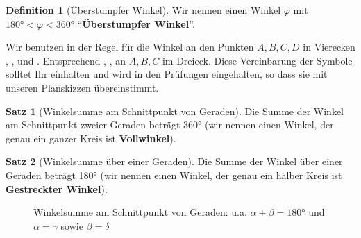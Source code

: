 \documentclass[a4paper]{book}%
\theoremstyle{definition}
\newtheorem{definition}{Definition}
\newtheorem{satz}{Satz}
\begin{document}
\begin{definition}[Überstumpfer Winkel]
    Wir nennen einen Winkel $\varphi$ mit $180° < \varphi < 360°$ \enquote{\textbf{Überstumpfer Winkel}}.
\end{definition}

Wir benutzen in der Regel für die Winkel an den Punkten $A, B, C, D$ in Vierecken , ,  und . Entsprechend , ,  an $A, B, C$ im Dreieck. Diese Vereinbarung der Symbole solltet Ihr einhalten und wird in den Prüfungen eingehalten, so dass sie mit unseren Planskizzen übereinstimmt.

\begin{satz}[Winkelsumme am Schnittpunkt von Geraden]
    Die Summe der Winkel am Schnittpunkt zweier Geraden beträgt 360° (wir nennen einen Winkel, der genau ein ganzer Kreis ist \textbf{Vollwinkel}).
\end{satz}

\begin{satz}[Winkelsumme über einer Geraden]
    Die Summe der Winkel über einer Geraden beträgt 180° (wir nennen einen Winkel, der genau ein halber Kreis ist \textbf{Gestreckter Winkel}).
\end{satz}

\begin{figure}
  \centering
  \caption{Winkelsumme am Schnittpunkt von Geraden: u.a. $\alpha + \beta = 180°$ und $\alpha = \gamma$ sowie $\beta = \delta$}\label{fig:WinkelsummeSchnittpunkt}
\end{figure}
\end{document}
